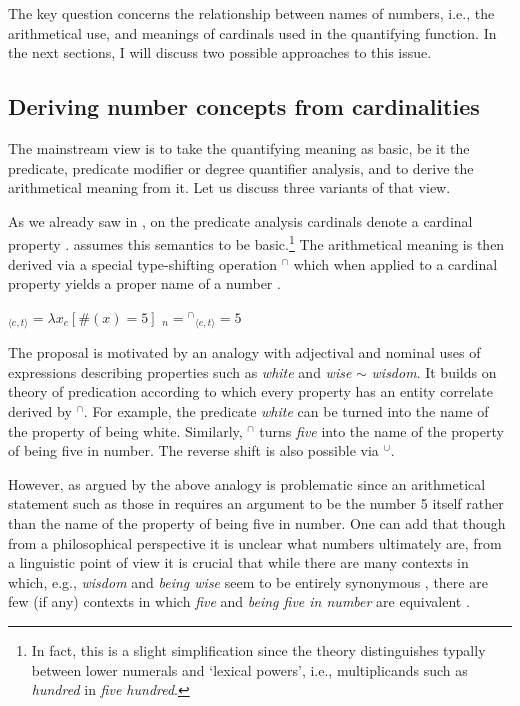 \documentclass[output=paper]{langscibook}
\begin{document}
\noindent The key question concerns the relationship between names of numbers, i.e., the arithmetical use, and meanings of cardinals used in the quantifying function. In the next sections, I will discuss two possible approaches to this issue.

\subsection{Deriving number concepts from cardinalities}\label{sec:deriving-number-concepts-from-cardinalities}

The mainstream view is to take the quantifying meaning as basic, be it the predicate, predicate modifier or degree quantifier analysis, and to derive the arithmetical meaning from it. Let us discuss three variants of that view. 
	
	As we already saw in , on the predicate analysis cardinals denote a cardinal property . \citet{rothstein2017semantics} assumes this semantics to be basic.\footnote{In fact, this is a slight simplification since the theory distinguishes typally between lower numerals and `lexical powers', i.e., multiplicands such as \textit{hundred} in \textit{five hundred}.} The arithmetical meaning is then derived via a special type-shifting operation ${}^{\cap}$ which when applied to a cardinal property yields a proper name of a number .
		
		\ea \ea {}$_{\langle e,t\rangle}=\lambda x_e[\#(x)=5]$\label{ex:five-et}
        \ex {}$_{n}= {}^{\cap}$$_{\langle e,t\rangle}=5$\label{ex:five-n}
        \z
        \z
		
		\noindent The proposal is motivated by an analogy with adjectival and nominal uses of expressions describing properties such as \textit{white} and \textit{wise} $\sim$ \textit{wisdom}. It builds on  theory of predication according to which every property has an entity correlate derived by ${}^{\cap}$. For example, the predicate \textit{white} can be turned into the name of the property of being white. Similarly, ${}^{\cap}$ turns \textit{five} into the name of the property of being five in number. The reverse shift is also possible via ${}^{\cup}$. 
		
		However, as argued by \citet[31--33]{ionin_matushansky2018cardinals} the above analogy is problematic since an arithmetical statement such as those in  requires an argument to be the number 5 itself rather than the name of the property of being five in number. One can add that though from a philosophical perspective it is unclear what numbers ultimately are, from a linguistic point of view it is crucial that while there are many contexts in which, e.g., \textit{wisdom} and \textit{being wise} seem to be entirely synonymous , there are few (if any) contexts in which \textit{five} and \textit{being five in number} are equivalent . 
        
\end{document}
